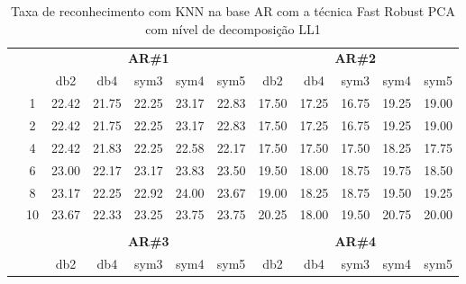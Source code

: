 \begin{table}[H]
	\centering
    \normalsize
	\caption{Taxa de reconhecimento com KNN na base AR com a técnica Fast Robust PCA com nível de decomposição LL1}
	\begin{tabular}{|c|c|c c c c c|c c c c c|}
\cline{3-12}
\multicolumn{2}{c|}{\multirow{2}{*}{}} & \multicolumn{5}{c|}{\textbf{AR\#1}}  & \multicolumn{5}{c|}{\textbf{AR\#2}} \\\cline{3-12}

\multicolumn{2}{c|}{}  & db2 & db4 & sym3 & sym4 & sym5 & db2 & db4& sym3 & sym4 & sym5 \\\hline

\multicolumn{1}{|c|}{ \multirow{5}{*}{\rotatebox[origin=c]{90}{\textbf{K-vizinhos}}} }
&1	&22.42	&21.75	&22.25	&23.17	&22.83	&17.50	&17.25	&16.75&	19.25	&19.00	\\\cline{2-12}
&2	&22.42	&21.75	&22.25	&23.17	&22.83	&17.50	&17.25	&16.75&	19.25	&19.00	\\\cline{2-12}
&4	&22.42	&21.83	&22.25	&22.58	&22.17	&17.50	&17.50	&17.50&	18.25	&17.75	\\\cline{2-12}
&6	&23.00	&22.17	&23.17	&23.83	&23.50	&19.50	&18.00	&18.75&	19.75	&18.50	\\\cline{2-12}
&8	&23.17	&22.25	&22.92	&24.00	&23.67	&19.00	&18.25	&18.75&	19.50	&19.25	\\\cline{2-12}
&10	&23.67	&22.33	&23.25	&23.75	&23.75	&20.25	&18.00	&19.50&	20.75	&20.00	




\\ \midrule
\multicolumn{12}{c}{}\\ 

\cline{3-12}
\multicolumn{2}{c}{} & \multicolumn{5}{|c|}{\textbf{AR\#3}}  & \multicolumn{5}{c|}{\textbf{AR\#4}} \\\cline{3-12}
\multicolumn{2}{c}{}  & \multicolumn{1}{|c}{db2} & db4 & sym3 & sym4 & sym5 & db2 & db4& sym3 & sym4 & sym5 \\\hline


\end{tabular}
\end{table}
